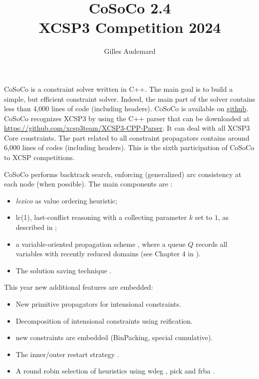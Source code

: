 \documentclass{llncs}
\newcommand{\h}[1]{\textit{#1}} %
\begin{document}
\pagestyle{empty}


\title{CoSoCo 2.4\\ {\small XCSP3 Competition 2024}}

\author{Gilles Audemard}



\maketitle




 CoSoCo is a constraint solver written in
C++. The main goal is to build
a simple, but efficient constraint solver. Indeed, the main part of
the solver contains less than 4,000 lines of code (including headers). CoSoCo is available on
\href{https://github.com/xcsp3team/cosoco}{github}. CoSoCo recognizes XCSP3
\cite{BLPPxcsp3} by using the C++ parser that can be downloaded at
\href{https://github.com/xcsp3team/XCSP3-CPP-Parser}{https://github.com/xcsp3team/XCSP3-CPP-Parser}. It
can deal with all XCSP3 Core constraints. The part related to
all constraint propagators contains around 6,000 lines of codes (including headers).
This is the sixth participation of CoSoCo to XCSP competitions.

\bigskip
CoSoCo performs backtrack search, enforcing (generalized) arc consistency at each node (when possible).  
The main components are :
\begin{itemize}
\item \h{lexico} as value ordering heuristic;
\item lc(1), last-conflict reasoning with a collecting parameter $k$ set to $1$, as described in \cite{LSTV_reasonning};
\item a variable-oriented propagation scheme \cite{G_relational}, where a queue $Q$ records all variables with recently reduced domains (see Chapter 4 in \cite{L_constraint}).
\item The solution saving technique \cite{vion2017}.
\end{itemize}



This year new additional features are embedded:
\begin{itemize}
\item New primitive propagators for intensional constraints.
\item Decomposition of intensional constraints using reification.
\item new constraints are embedded (BinPacking, special cumulative).
\item The inner/outer restart strategy \cite{inner}.
  \item A round robin selection of heuristics using wdeg \cite{BHLS_boosting}, pick \cite{pick} and frba \cite{LYL_fra}.
\end{itemize}  
\end{document}
